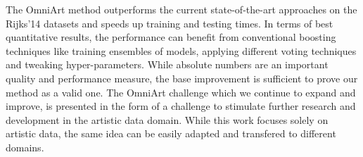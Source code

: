 \documentclass[sigconf]{acmart}
\begin{document}
The OmniArt method outperforms the current state-of-the-art approaches on the Rijks'14 datasets and speeds up training and testing times. In terms of best quantitative results, the performance can benefit from conventional boosting techniques like training ensembles of models, applying different voting techniques and tweaking hyper-parameters. While absolute numbers are an important quality and performance measure, the base improvement is sufficient to prove our method as a valid one. The OmniArt challenge which we continue to expand and improve, is presented in the form of a challenge to stimulate further research and development in the artistic data domain. While this work focuses solely on artistic data, the same idea can be easily adapted and transfered to different domains. 


 
\end{document}
